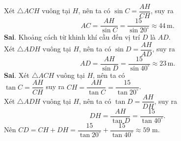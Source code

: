 \begin{ex}
{\begin{itemchoice}
	Xét $\triangle ACH$ vuông tại $H$, nên ta có $\sin C = \dfrac{AH}{CH}$, suy ra $$AC = \dfrac{AH}{\sin C} = \dfrac{15}{\sin 20^\circ} \approx 44\,\mathrm{m}.$$
	\itemch \textbf{Sai}. Khoảng cách từ khinh khí cầu đến vị trí $D$ là $AD$.\\
	Xét $\triangle ADH$ vuông tại $H$, nên ta có $\sin D = \dfrac{AH}{AD}$, suy ra $$AD = \dfrac{AH}{\sin D} = \dfrac{15}{\sin 40^\circ} \approx 23\,\mathrm{m}.$$
	\itemch \textbf{Sai}. Xét $\triangle ACH$ vuông tại $H$, nên ta có\\
	$\tan C = \dfrac{AH}{CH}$ suy ra $CH = \dfrac{AH}{\tan C} = \dfrac{15}{\tan 20^\circ}$.\\
	Xét $\triangle ADH$ vuông tại $H$, nên ta có $\tan D = \dfrac{AH}{DH}$, suy ra $$DH = \dfrac{AH}{\tan D} = \dfrac{15}{\tan 40^\circ}.$$
	Nên $CD = CH + DH = \dfrac{15}{\tan 20^\circ} + \dfrac{15}{\tan 40^\circ} \approx 59$ m.
	\end{itemchoice}
	}
\end{ex}
